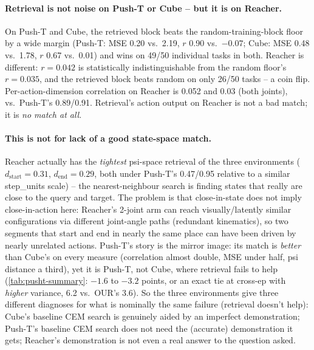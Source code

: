 \documentclass[11pt]{article}
\begin{document}
\paragraph{Retrieval is not noise on Push-T or Cube -- but it is on Reacher.} On Push-T and
Cube, the retrieved block beats the random-training-block floor by a wide margin (Push-T: MSE
0.20 vs.\ 2.19, $r$ 0.90 vs.\ $-0.07$; Cube: MSE 0.48 vs.\ 1.78, $r$ 0.67 vs.\ 0.01) and wins on
49/50 individual tasks in both. Reacher is different: $r=0.042$ is statistically
indistinguishable from the random floor's $r=0.035$, and the retrieved block beats random on
only 26/50 tasks -- a coin flip. Per-action-dimension correlation on Reacher is 0.052 and 0.03
(both joints), vs.\ Push-T's 0.89/0.91. Retrieval's action output on Reacher is not a bad
match; it is \emph{no match at all}.

\paragraph{This is not for lack of a good state-space match.} Reacher actually has the
\emph{tightest} psi-space retrieval of the three environments ($d_{\mathrm{start}}=0.31$,
$d_{\mathrm{end}}=0.29$, both under Push-T's 0.47/0.95 relative to a similar step\_units scale)
-- the nearest-neighbour search is finding states that really are close to the query and
target. The problem is that close-in-state does not imply close-in-action here: Reacher's
2-joint arm can reach visually/latently similar configurations via different joint-angle paths
(redundant kinematics), so two segments that start and end in nearly the same place can have
been driven by nearly unrelated actions. Push-T's story is the mirror image: its match is
\emph{better} than Cube's on every measure (correlation almost double, MSE under half, psi
distance a third), yet it is Push-T, not Cube, where retrieval fails to help
(\cref{tab:pusht-summary}: $-1.6$ to $-3.2$ points, or an exact tie at cross-ep with
\emph{higher} variance, 6.2 vs.\ OUR's 3.6). So the three environments give three different
diagnoses for what is nominally the same failure (retrieval doesn't help): Cube's baseline CEM
search is genuinely aided by an imperfect demonstration; Push-T's baseline CEM search does not
need the (accurate) demonstration it gets; Reacher's demonstration is not even a real answer to
the question asked.
\end{document}
